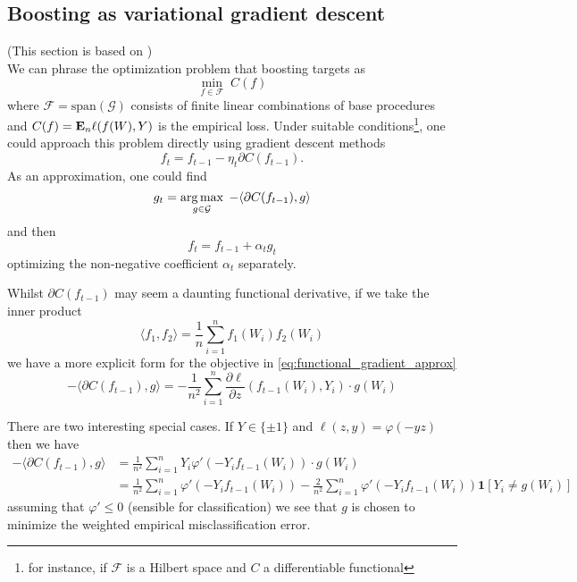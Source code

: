 \subsection{Boosting as variational gradient descent}
(This section is based on \cite{mason2000boosting}) \\
We can phrase the optimization problem that boosting targets as
\begin{equation}
	\min_{f \in \mathcal{F}} \; C(f)
\end{equation}
where $\mathcal{F} = \text{span}(\mathcal{G})$ consists of finite linear combinations of base procedures and $C(f) = \mathbf{E}_n \ell(f(W), Y)$ is the empirical loss. Under suitable conditions\footnote{for instance, if $\mathcal{F}$ is a Hilbert space and $C$ a differentiable functional}, one could approach this problem directly using gradient descent methods
\begin{equation*}
	f_t = f_{t-1} - \eta_t \partial C (f_{t-1}).
\end{equation*}
As an approximation, one could find
\begin{equation}
	\label{eq:functional_gradient_approx}
	g_t = \operatorname*{arg\,max}_{g\in\mathcal{G}} \; -\langle \partial C(f_{t-1}), g \rangle
\end{equation}
and then
\begin{equation*}
	f_t = f_{t-1} + \alpha_t g_t
\end{equation*}
optimizing the non-negative coefficient $\alpha_t$ separately.

Whilst $\partial C(f_{t-1})$ may seem a daunting functional derivative, if we take the inner product
\begin{equation}
	\label{eq:boost_inner_prod}
	\langle f_1, f_2 \rangle = \frac{1}{n} \sum_{i=1}^n f_1(W_i)f_2(W_i)
\end{equation}
we have a more explicit form for the objective in \eqref{eq:functional_gradient_approx}
\begin{equation*}
	-\langle \partial C(f_{t-1}), g \rangle = -\frac{1}{n^2} \sum_{i=1}^n \frac{\partial \ell}{\partial z}(f_{t-1}(W_i), Y_i) \cdot g(W_i)
\end{equation*}

There are two interesting special cases. If $Y \in \{\pm 1\}$ and $\ell(z, y) = \varphi(-yz)$ then we have
\begin{align*}
	-\langle \partial C(f_{t-1}), g \rangle &= \frac{1}{n^2}\sum_{i=1}^n Y_i\varphi '(-Y_i f_{t-1}(W_i)) \cdot g(W_i) \\	
	&= \frac{1}{n^2}\sum_{i=1}^n \varphi ' (-Y_i f_{t-1}(W_i)) - \frac{2}{n^2} \sum_{i=1}^n \varphi ' (-Y_i f_{t-1}(W_i)) \mathbf{1}[Y_i \ne g(W_i)]
\end{align*}
assuming that $\varphi ' \le 0$ (sensible for classification) we see that $g$ is chosen to minimize the weighted empirical misclassification error.

